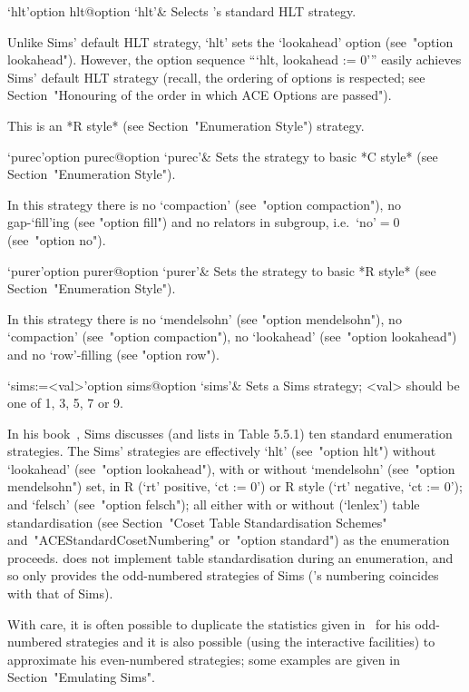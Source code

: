 \>`hlt'{option hlt}@{option `hlt'}&
Selects  {\ACE}'s   standard   HLT   strategy.   

Unlike  Sims'  \cite{Sim94}  default  HLT  strategy,  `hlt'  sets  the
`lookahead'  option  (see~"option  lookahead").  However,  the  option
sequence ```hlt, lookahead := 0''' easily achieves Sims'  default  HLT
strategy  (recall,  the  ordering  of  options   is   respected;   see
Section~"Honouring of the order in which ACE Options are passed").

This is an *R style* (see Section~"Enumeration Style") strategy.

\>`purec'{option purec}@{option `purec'}&
Sets the strategy to basic *C style* (see Section~"Enumeration  Style").

In this strategy there is no `compaction'  (see~"option  compaction"),
no gap-`fill'ing (see "option fill")  and  no  relators  in  subgroup,
i.e.~`no'${}=0$ (see~"option no").

\>`purer'{option purer}@{option `purer'}&
Sets the strategy  to basic *R style* (see Section~"Enumeration  Style").

In this strategy there is no `mendelsohn' (see  "option  mendelsohn"),
no `compaction' (see~"option compaction"), no `lookahead' (see~"option
lookahead") and no `row'-filling (see "option row").

\>`sims:=<val>'{option sims}@{option `sims'}&
Sets a Sims strategy; <val> should be one of 1, 3, 5, 7 or 9.

In his book~\cite{Sim94}, Sims discusses (and lists  in  Table  5.5.1)
ten  standard  enumeration  strategies.  The  Sims'   strategies   are
effectively `hlt' (see~"option hlt") without `lookahead'  (see~"option
lookahead"), with or without  `mendelsohn'  (see~"option  mendelsohn")
set, in R (`rt' positive, `ct := 0') or R\* style (`rt' negative,  `ct
:= 0'); and `felsch' (see~"option felsch"); all either with or without
(`lenlex')   table   standardisation   (see    Section~"Coset    Table
Standardisation  Schemes"  and~"ACEStandardCosetNumbering"  or~"option
standard") as the enumeration  proceeds.  {\ACE}  does  not  implement
table standardisation during an enumeration, and so only provides  the
odd-numbered strategies of Sims  ({\ACE}'s  numbering  coincides  with
that of Sims).

With care, it is often possible  to  duplicate  the  statistics  given
in~\cite{Sim94}  for  his  odd-numbered  strategies  and  it  is  also
possible  (using  the  interactive  facilities)  to  approximate   his
even-numbered    strategies;    some    examples    are    given    in
Section~"Emulating Sims".

\enditems


